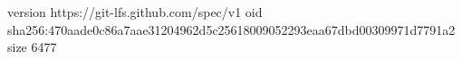version https://git-lfs.github.com/spec/v1
oid sha256:470aade0c86a7aae31204962d5c25618009052293eaa67dbd00309971d7791a2
size 6477
